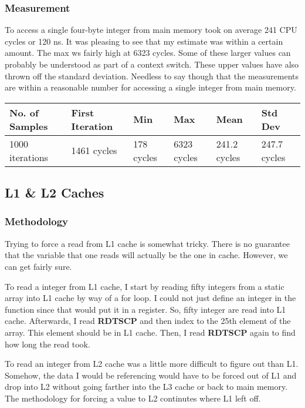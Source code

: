 \documentclass[paper=a4, fontsize=11pt]{scrartcl}
\numberwithin{equation}{section}        %
\numberwithin{figure}{section}          %
\numberwithin{table}{section}               %
\begin{document}
\subsubsection{Measurement}

To access a single four-byte integer from main memory took on average 241 CPU cycles or 120 ns.  It was pleasing to see that my estimate was within a certain amount.  The max ws fairly high at 6323 cycles.  Some of these larger values can probably be understood as part of a context switch.  These upper values have also thrown off the standard deviation.  Needless to say though that the measurements are within a reasonable number for accessing a single integer from main memory.


\begin{center}
    \begin{tabular}{ | l | l | l | l | l | l |}
    \hline
    No. of Samples & First Iteration & Min & Max & Mean & Std Dev \\ \hline
    1000 iterations & 1461 cycles & 178 cycles & 6323 cycles & 241.2 cycles & 247.7  cycles \\ 
    \hline
    \end{tabular}
\end{center}

\subsection{L1 \& L2 Caches}

\subsubsection{Methodology}

Trying to force a read from L1 cache is somewhat tricky.  There is no guarantee that the variable that one reads will actually be the one in cache.  However, we can get fairly sure.

To read a integer from L1 cache, I start by reading fifty integers from a static array into L1 cache by way of a for loop.  I could not just define an integer in the function since that would put it in a register.  So, fifty integer are read into L1 cache.  Afterwards, I read \textbf{RDTSCP} and then index to the 25th element of the array.  This element should be in L1 cache.  Then, I read \textbf{RDTSCP} again to find how long the read took.

To read an integer from L2 cache was a little more difficult to figure out than L1.  Somehow, the data I would be referencing would have to be forced out of L1 and drop into L2 without going farther into the L3 cache or back to main memory.  The methodology for forcing a value to L2 continutes where L1 left off.
\end{document}
